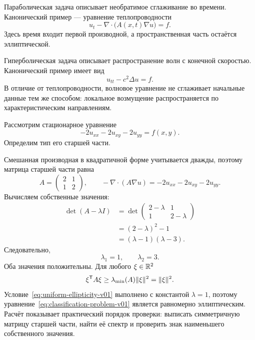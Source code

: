 Параболическая задача описывает необратимое сглаживание во времени. Канонический пример --- уравнение теплопроводности
\begin{equation}
\label{eq:parabolic-model-v01}
u_t-\nabla\cdot\bigl(A(x,t)\nabla u\bigr)=f.
\end{equation}
Здесь время входит первой производной, а пространственная часть остаётся эллиптической.

Гиперболическая задача описывает распространение волн с конечной скоростью. Канонический пример имеет вид
\begin{equation}
\label{eq:hyperbolic-model-v01}
u_{tt}-c^2\Delta u=f.
\end{equation}
В отличие от теплопроводности, волновое уравнение не сглаживает начальные данные тем же способом: локальное возмущение распространяется по характеристическим направлениям.

\begin{problem}
Рассмотрим стационарное уравнение
\begin{equation}
\label{eq:classification-problem-v01}
-2u_{xx}-2u_{xy}-2u_{yy}=f(x,y).
\end{equation}
Определим тип его старшей части.
\end{problem}

Смешанная производная в квадратичной форме учитывается дважды, поэтому матрица старшей части равна
\[
A=
\begin{pmatrix}
2&1\\
1&2
\end{pmatrix},
\qquad
-\nabla\cdot(A\nabla u)
=-2u_{xx}-2u_{xy}-2u_{yy}.
\]
Вычисляем собственные значения:
\begin{align}
\det(A-\lambda I)
&=
\det
\begin{pmatrix}
2-\lambda&1\\
1&2-\lambda
\end{pmatrix}
\\
&=(2-\lambda)^2-1
\\
&=(\lambda-1)(\lambda-3).
\end{align}
Следовательно,
\[
\lambda_1=1,
\qquad
\lambda_2=3.
\]
Оба значения положительны. Для любого $\xi\in\mathbb{R}^2$
\[
\xi^{\mathsf{T}}A\xi
\geq
\lambda_{\min}(A)\lVert\xi\rVert^2
=
\lVert\xi\rVert^2.
\]
Условие~\eqref{eq:uniform-ellipticity-v01} выполнено с константой $\lambda=1$, поэтому уравнение~\eqref{eq:classification-problem-v01} является равномерно эллиптическим. Расчёт показывает практический порядок проверки: выписать симметричную матрицу старшей части, найти её спектр и проверить знак наименьшего собственного значения.


